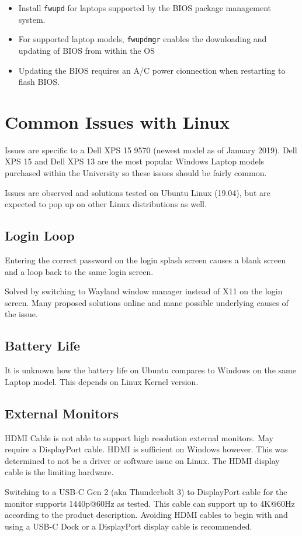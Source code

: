 \documentclass[8pt,a4paper]{article}
\begin{document}
\begin{itemize}
	\item Install \texttt{fwupd} for laptops supported by the BIOS package management system.
	\item For supported laptop models, \texttt{fwupdmgr} enables the downloading and updating of BIOS from within the OS
	\item Updating the BIOS requires an A/C power cionnection when restarting to flash BIOS.
\end{itemize}

\section{Common Issues with Linux}

Issues are specific to a Dell XPS 15 9570 (newest model as of January 2019). Dell XPS 15 and Dell XPS 13 are the most popular Windows Laptop models purchased within the University so these issues should be fairly common.

Issues are observed and solutions tested on Ubuntu Linux (19.04), but are expected to pop up on other Linux distributions as well.

\subsection{Login Loop}

Entering the correct password on the login splash screen causes a blank screen and a loop back to the same login screen.

Solved by switching to Wayland window manager instead of X11 on the login screen. Many proposed solutions online and mane possible underlying causes of the issue.

\subsection{Battery Life}

It is unknown how the battery life on Ubuntu compares to Windows on the same Laptop model. This depends on Linux Kernel version.

\subsection{External Monitors}

HDMI Cable is not able to support high resolution external monitors. May require a DisplayPort cable. HDMI is sufficient on Windows however. This was determined to not be a driver or software issue on Linux. The HDMI display cable is the limiting hardware.

Switching to a USB-C Gen 2 (aka Thunderbolt 3) to DisplayPort cable for the monitor supports 1440p@60Hz as tested. This cable can support up to 4K@60Hz according to the product description. Avoiding HDMI cables to begin with and using a USB-C Dock or a DisplayPort display cable is recommended.
\end{document}
